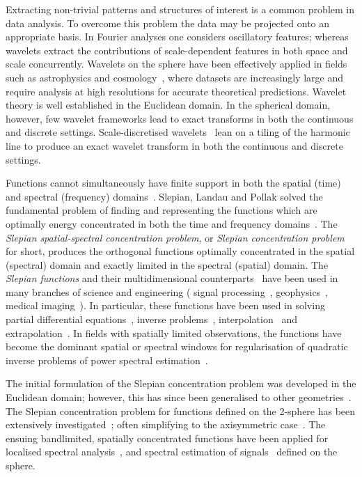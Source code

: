 Extracting non-trivial patterns and structures of interest is a common problem in data analysis.
To overcome this problem the data may be projected onto an appropriate basis.
In Fourier analyses one considers oscillatory features; whereas wavelets extract the contributions of scale-dependent features in both space and scale concurrently.
Wavelets on the sphere have been effectively applied in fields such as astrophysics and cosmology~\cite{Pen1999,Barreiro2001,Rocha2004,McEwen2004}, where datasets are increasingly large and require analysis at high resolutions for accurate theoretical predictions.
Wavelet theory is well established in the Euclidean domain.
In the spherical domain, however, few wavelet frameworks lead to exact transforms in both the continuous and discrete settings.
Scale-discretised wavelets~\cite{Wiaux2008,McEwen2018,Leistedt2013,McEwen2013,McEwen2015} lean on a tiling of the harmonic line to produce an exact wavelet transform in both the continuous and discrete settings.

Functions cannot simultaneously have finite support in both the spatial (time) and spectral (frequency) domains~\cite{Slepian1961,Slepian1983}.
Slepian, Landau and Pollak solved the fundamental problem of finding and representing the functions which are optimally energy concentrated in both the time and frequency domains~\cite{Slepian1961,Landau1961,Landau1962}.
The \emph{Slepian spatial-spectral concentration problem}, or \emph{Slepian concentration problem} for short, produces the orthogonal functions optimally concentrated in the spatial (spectral) domain and exactly limited in the spectral (spatial) domain.
The \emph{Slepian functions} and their multidimensional counterparts~\cite{Slepian1964,Simons2011a} have been used in many branches of science and engineering (\eg{} signal processing~\cite{Mathews1985,Thomson1982}, geophysics~\cite{Thomson1976,Simons2006a,Simons2011}, medical imaging~\cite{Jackson1991}).
In particular, these functions have been used in solving partial differential equations~\cite{Boyd2003,Chen2005}, inverse problems~\cite{Villiers2001,Abdelmoula2015}, interpolation~\cite{Moore2004,Shkolnisky2006} and extrapolation~\cite{Xu1983}.
In fields with spatially limited observations, the functions have become the dominant spatial or spectral windows for regularisation of quadratic inverse problems of power spectral estimation~\cite{Thomson1976}.

The initial formulation of the Slepian concentration problem was developed in the Euclidean domain; however, this has since been generalised to other geometries~\cite{Simons2006,Wieczorek2005,Albertella1999,Cohen1989,Meaney1984,Daubechies1988}.
The Slepian concentration problem for functions defined on the 2-sphere has been extensively investigated~\cite{Simons2006,Wieczorek2005,Albertella1999}; often simplifying to the axisymmetric case~\cite{Simons2006a,Simons2013}.
The ensuing bandlimited, spatially concentrated functions have been applied for localised spectral analysis~\cite{Wieczorek2005}, and spectral estimation of signals~\cite{Wieczorek2007} defined on the sphere.

